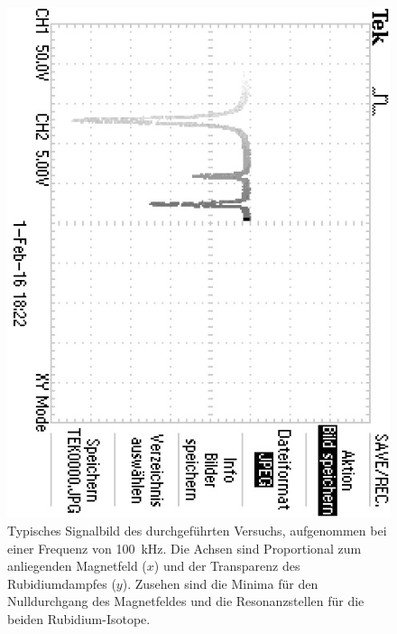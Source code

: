 \FloatBarrier
\begin{figure}[!h]
\centering
\includegraphics[scale=1,angle=90]{../Grafiken/Signalbild_RF100kHz.jpg}
\caption{Typisches Signalbild des durchgeführten Versuchs, aufgenommen bei einer Frequenz von \SI{100}{\kilo\hertz}. 
	Die Achsen sind Proportional zum anliegenden Magnetfeld ($x$) und der Transparenz des Rubidiumdampfes ($y$). 
	Zusehen sind die Minima für den Nulldurchgang des Magnetfeldes und die Resonanzstellen für die beiden 
	Rubidium-Isotope.\label{fig:signalbild_rf100khz}}
\end{figure}
\FloatBarrier